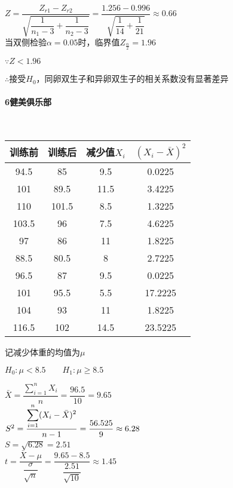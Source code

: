 \documentclass[UTF8]{ctexart}
\begin{document}
$Z=\dfrac{Z_{r1}-Z_{r2}}{\sqrt{\dfrac{1}{n_{1}-3}+\dfrac{1}{n_{2}-3}}}=\dfrac{1.256-0.996}{\sqrt{\dfrac{1}{14}+\dfrac{1}{21}}}\approx0.66$
~\\

当双侧检验$\alpha=0.05$时，临界值$Z_{\frac{\alpha}{2}}=1.96$

$\because Z < 1.96$

$\therefore$接受$H_0$，同卵双生子和异卵双生子的相关系数没有显著差异


\paragraph{6健美俱乐部}
~\\

\begin{tabular}{cccc}
\toprule
训练前 & 训练后 & 减少值$X_i$ & $(X_i-\bar{X})^2$ \\
\midrule
94.5 & 85 & 9.5 & 0.0225 \\
101 & 89.5 & 11.5 & 3.4225 \\
110 & 101.5 & 8.5 & 1.3225 \\
103.5 & 96 & 7.5 & 4.6225 \\
97 & 86 & 11 & 1.8225 \\
88.5 & 80.5 & 8 & 2.7225 \\
96.5 & 87 & 9.5 & 0.0225 \\
101 & 95.5 & 5.5 & 17.2225 \\
104 & 93 & 11 & 1.8225 \\
116.5 & 102 & 14.5 & 23.5225 \\

\bottomrule
\end{tabular}

记减少体重的均值为$\mu$

$H_0:\mu<8.5 \qquad H_1:\mu\ge8.5$


$\bar{X}=\dfrac{\displaystyle \sum_{i=1}^{n}X_i}{n}=\dfrac{96.5}{10}=9.65$
~\\

$S^2=\dfrac{\displaystyle \sum_{i=1}^n (X_i-\Bar{X})^2}{n-1}=\dfrac{56.525}{9}\approx6.28$
~\\

$S=\sqrt{6.28}=2.51$
~\\

$t=\dfrac{\bar{X}-\mu}{\dfrac{\sigma}{\sqrt{n}}}=\dfrac{9.65-8.5}{\dfrac{2.51}{\sqrt{10}}}\approx1.45$
~\\
\end{document}
